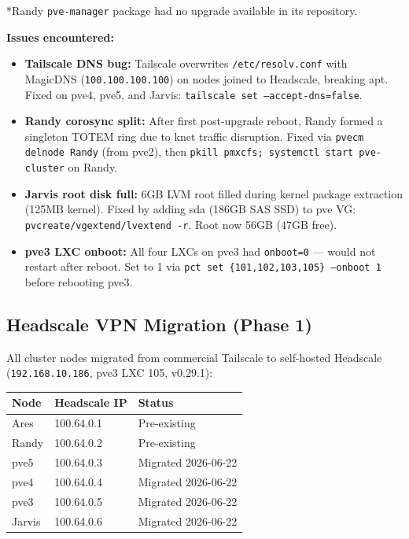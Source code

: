 \documentclass[11pt,a4paper]{article}
\begin{document}
*Randy \texttt{pve-manager} package had no upgrade available in its repository.

\textbf{Issues encountered:}
\begin{itemize}[nosep]
  \item \textbf{Tailscale DNS bug:} Tailscale overwrites \texttt{/etc/resolv.conf} with
    MagicDNS (\texttt{100.100.100.100}) on nodes joined to Headscale, breaking apt.
    Fixed on pve4, pve5, and Jarvis: \texttt{tailscale set --accept-dns=false}.
  \item \textbf{Randy corosync split:} After first post-upgrade reboot, Randy formed a
    singleton TOTEM ring due to knet traffic disruption. Fixed via \texttt{pvecm delnode
    Randy} (from pve2), then \texttt{pkill pmxcfs; systemctl start pve-cluster} on Randy.
  \item \textbf{Jarvis root disk full:} 6GB LVM root filled during kernel package extraction
    (125MB kernel). Fixed by adding sda (186GB SAS SSD) to pve VG:
    \texttt{pvcreate/vgextend/lvextend -r}. Root now 56GB (47GB free).
  \item \textbf{pve3 LXC onboot:} All four LXCs on pve3 had \texttt{onboot=0} — would not
    restart after reboot. Set to 1 via \texttt{pct set \{101,102,103,105\} --onboot 1} before rebooting pve3.
\end{itemize}

\subsection{Headscale VPN Migration (Phase 1)}

All cluster nodes migrated from commercial Tailscale to self-hosted Headscale
(\texttt{192.168.10.186}, pve3 LXC 105, v0.29.1):

\begin{center}
\begin{tabular}{lll}
\toprule
\textbf{Node} & \textbf{Headscale IP} & \textbf{Status} \\
\midrule
Ares & 100.64.0.1 & Pre-existing \\
Randy & 100.64.0.2 & Pre-existing \\
pve5 & 100.64.0.3 & Migrated 2026-06-22 \\
pve4 & 100.64.0.4 & Migrated 2026-06-22 \\
pve3 & 100.64.0.5 & Migrated 2026-06-22 \\
Jarvis & 100.64.0.6 & Migrated 2026-06-22 \\
\bottomrule
\end{tabular}
\end{center}
\end{document}
